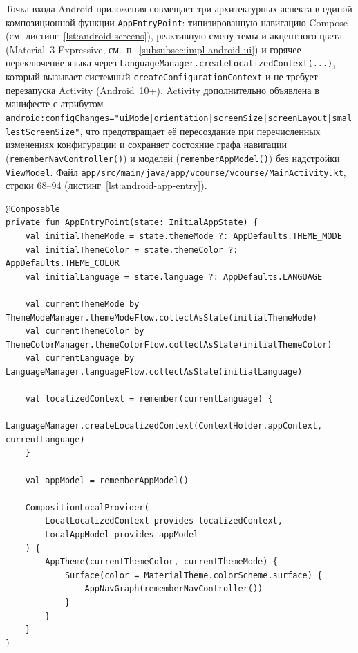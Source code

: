 Точка входа Android-приложения совмещает три архитектурных аспекта в единой композиционной функции \texttt{AppEntryPoint}: типизированную навигацию Compose (см. листинг~\ref{lst:android-screens}), реактивную смену темы и акцентного цвета (Material~3 Expressive, см.~п.~\ref{subsubsec:impl-android-ui}) и горячее переключение языка через \texttt{LanguageManager.createLocalizedContext(...)}, который вызывает системный \texttt{createConfigurationContext} и не требует перезапуска Activity (Android~10+). Activity дополнительно объявлена в манифесте с атрибутом \texttt{android:\allowbreak configChanges=\allowbreak "uiMode\allowbreak |orientation\allowbreak |screenSize\allowbreak |screenLayout\allowbreak |smallestScreenSize"}, что предотвращает её пересоздание при перечисленных изменениях конфигурации и сохраняет состояние графа навигации (\texttt{rememberNavController()}) и моделей (\texttt{rememberAppModel()}) без надстройки \texttt{ViewModel}. Файл \texttt{app/\allowbreak src/\allowbreak main/\allowbreak java/\allowbreak app/\allowbreak vcourse/\allowbreak vcourse/\allowbreak MainActivity.kt}, строки 68--94 (листинг~\ref{lst:android-app-entry}).

\begin{lstlisting}[caption={Точка входа Android-приложения с реактивной темой и горячим переключением языка},label=lst:android-app-entry]
@Composable
private fun AppEntryPoint(state: InitialAppState) {
    val initialThemeMode = state.themeMode ?: AppDefaults.THEME_MODE
    val initialThemeColor = state.themeColor ?: AppDefaults.THEME_COLOR
    val initialLanguage = state.language ?: AppDefaults.LANGUAGE

    val currentThemeMode by ThemeModeManager.themeModeFlow.collectAsState(initialThemeMode)
    val currentThemeColor by ThemeColorManager.themeColorFlow.collectAsState(initialThemeColor)
    val currentLanguage by LanguageManager.languageFlow.collectAsState(initialLanguage)

    val localizedContext = remember(currentLanguage) {
        LanguageManager.createLocalizedContext(ContextHolder.appContext, currentLanguage)
    }

    val appModel = rememberAppModel()

    CompositionLocalProvider(
        LocalLocalizedContext provides localizedContext,
        LocalAppModel provides appModel
    ) {
        AppTheme(currentThemeColor, currentThemeMode) {
            Surface(color = MaterialTheme.colorScheme.surface) {
                AppNavGraph(rememberNavController())
            }
        }
    }
}
\end{lstlisting}

